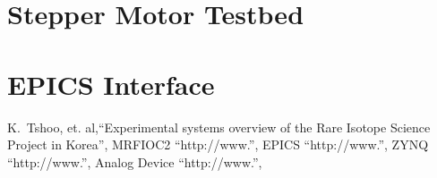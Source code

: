 \documentclass[11pt
-  , a4paper
  , article
  , oneside
]{memoir}
\begin{document}
\begin{multicols}{2}
\chapter{Stepper Motor Testbed}

\chapter{EPICS Interface}

\end{multicols}
	
	



\newpage
\vspace*{0.5cm}
\renewcommand{\bibname}{References}
\begin{thebibliography}{9}   %
 K.~Tshoo,{ et. al},``Experimental systems overview of the Rare Isotope Science Project in Korea'',
 MRFIOC2 ``http://www.'',
 EPICS ``http://www.'',
 ZYNQ ``http://www.'',
 Analog Device ``http://www.'',

\end{thebibliography}
\end{document}
